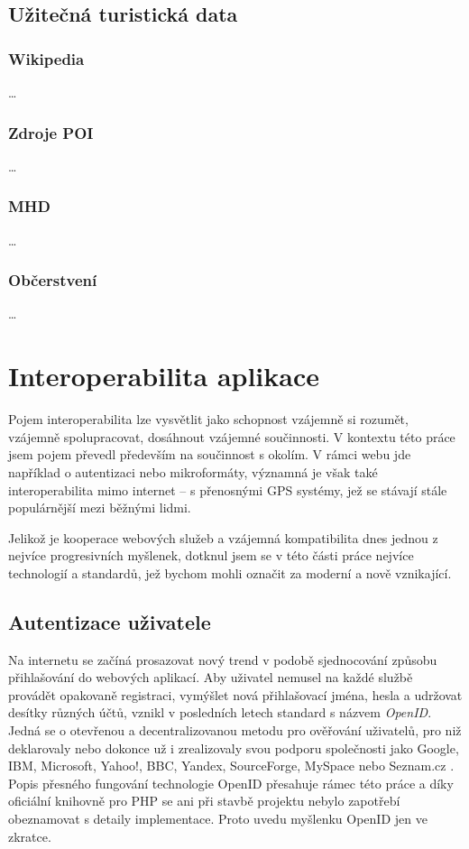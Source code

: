 \section{Užitečná turistická data}
\subsection{Wikipedia}
\ldots
\subsection{Zdroje POI}
\ldots
\subsection{MHD}
\ldots
\subsection{Občerstvení}
\ldots

\chapter{Interoperabilita aplikace}
Pojem interoperabilita lze vysvětlit jako schopnost vzájemně si
rozumět, vzájemně spolupracovat, dosáhnout vzájemné součinnosti. V
kontextu této práce jsem pojem převedl především na součinnost s
okolím. V rámci webu jde například o autentizaci nebo mikroformáty,
významná je však také interoperabilita mimo internet -- s přenosnými
GPS systémy, jež se stávají stále populárnější mezi běžnými lidmi.

Jelikož je kooperace webových služeb a vzájemná kompatibilita dnes
jednou z nejvíce progresivních myšlenek, dotknul jsem se v této části
práce nejvíce technologií a standardů, jež bychom mohli označit za
moderní a nově vznikající.

\section{Autentizace uživatele}\label{openid}
Na internetu se začíná prosazovat nový trend v podobě sjednocování
způsobu přihlašování do webových aplikací. Aby uživatel nemusel na každé
službě provádět opakovaně registraci, vymýšlet nová
přihlašovací jména, hesla a udržovat desítky různých účtů, vznikl v
posledních letech standard s názvem {\it OpenID}. Jedná se o
otevřenou a decentralizovanou metodu pro ověřování uživatelů, pro niž
deklarovaly nebo dokonce už i zrealizovaly svou podporu společnosti
jako Google, IBM, Microsoft, Yahoo!, BBC, Yandex, SourceForge, MySpace
nebo Seznam.cz \cite{dataportability}. Popis přesného fungování technologie
OpenID přesahuje rámec této práce a díky oficiální knihovně pro PHP
se ani při stavbě projektu nebylo zapotřebí obeznamovat s detaily
implementace. Proto uvedu myšlenku OpenID jen ve zkratce.

